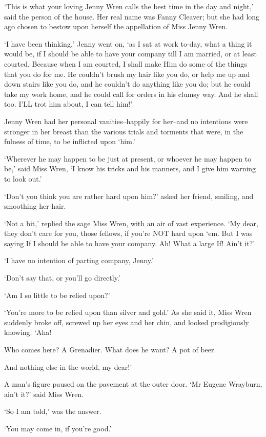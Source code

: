 ‘This is what your loving Jenny Wren calls the best time in the day and
night,’ said the person of the house. Her real name was Fanny Cleaver;
but she had long ago chosen to bestow upon herself the appellation of
Miss Jenny Wren.

‘I have been thinking,’ Jenny went on, ‘as I sat at work to-day, what
a thing it would be, if I should be able to have your company till I am
married, or at least courted. Because when I am courted, I shall make
Him do some of the things that you do for me. He couldn’t brush my hair
like you do, or help me up and down stairs like you do, and he couldn’t
do anything like you do; but he could take my work home, and he could
call for orders in his clumsy way. And he shall too. I’LL trot him
about, I can tell him!’

Jenny Wren had her personal vanities--happily for her--and no intentions
were stronger in her breast than the various trials and torments that
were, in the fulness of time, to be inflicted upon ‘him.’

‘Wherever he may happen to be just at present, or whoever he may happen
to be,’ said Miss Wren, ‘I know his tricks and his manners, and I give
him warning to look out.’

‘Don’t you think you are rather hard upon him?’ asked her friend,
smiling, and smoothing her hair.

‘Not a bit,’ replied the sage Miss Wren, with an air of vast experience.
‘My dear, they don’t care for you, those fellows, if you’re NOT hard
upon ‘em. But I was saying If I should be able to have your company. Ah!
What a large If! Ain’t it?’

‘I have no intention of parting company, Jenny.’

‘Don’t say that, or you’ll go directly.’

‘Am I so little to be relied upon?’

‘You’re more to be relied upon than silver and gold.’ As she said it,
Miss Wren suddenly broke off, screwed up her eyes and her chin, and
looked prodigiously knowing. ‘Aha!

     Who comes here?
     A Grenadier.
     What does he want?
     A pot of beer.

And nothing else in the world, my dear!’

A man’s figure paused on the pavement at the outer door. ‘Mr Eugene
Wrayburn, ain’t it?’ said Miss Wren.

‘So I am told,’ was the answer.

‘You may come in, if you’re good.’

